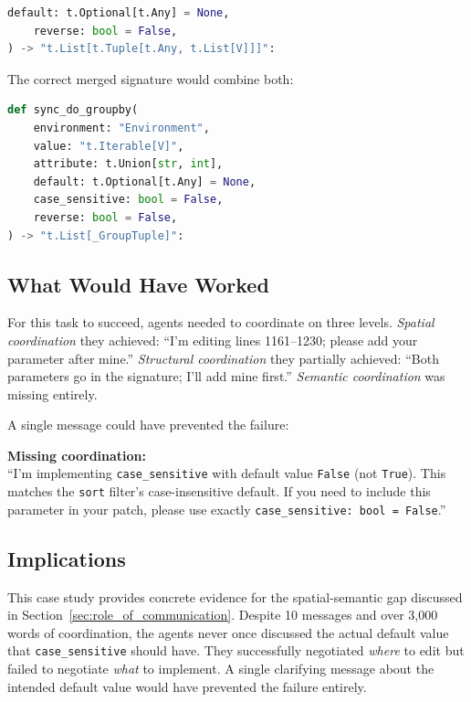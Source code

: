 \begin{lstlisting}[language=Python,basicstyle=\small\ttfamily]
    default: t.Optional[t.Any] = None,
    reverse: bool = False,
) -> "t.List[t.Tuple[t.Any, t.List[V]]]":
\end{lstlisting}

The correct merged signature would combine both:

\begin{lstlisting}[language=Python,basicstyle=\small\ttfamily]
def sync_do_groupby(
    environment: "Environment",
    value: "t.Iterable[V]",
    attribute: t.Union[str, int],
    default: t.Optional[t.Any] = None,
    case_sensitive: bool = False,
    reverse: bool = False,
) -> "t.List[_GroupTuple]":
\end{lstlisting}

\subsection{What Would Have Worked}

For this task to succeed, agents needed to coordinate on three levels. \emph{Spatial coordination} they achieved: ``I'm editing lines 1161--1230; please add your parameter after mine.'' \emph{Structural coordination} they partially achieved: ``Both parameters go in the signature; I'll add mine first.'' \emph{Semantic coordination} was missing entirely.

A single message could have prevented the failure:

\begin{tcolorbox}[evidencebox]
\small
\textbf{Missing coordination:}\\
``I'm implementing \texttt{case\_sensitive} with default value \texttt{False} (not \texttt{True}). This matches the \texttt{sort} filter's case-insensitive default. If you need to include this parameter in your patch, please use exactly \texttt{case\_sensitive: bool = False}.''
\end{tcolorbox}

\subsection{Implications}

This case study provides concrete evidence for the spatial-semantic gap discussed in Section~\ref{sec:role_of_communication}. Despite 10 messages and over 3,000 words of coordination, the agents never once discussed the actual default value that \texttt{case\_sensitive} should have. They successfully negotiated \emph{where} to edit but failed to negotiate \emph{what} to implement. A single clarifying message about the intended default value would have prevented the failure entirely.




